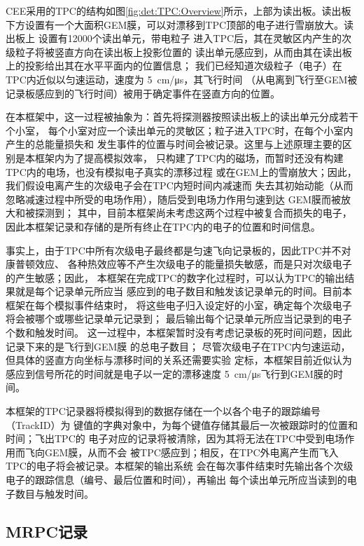 \documentclass[bachelor,openany,oneside,color]{buaathesis}
\begin{document}
CEE采用的TPC的结构如图\ref{fig:det:TPC:Overview}所示，上部为读出板。读出板
下方设置有一个大面积GEM膜，可以对漂移到TPC顶部的电子进行雪崩放大。读出板上
设置有12000个读出单元\cite{技术文档,Lyu:ConceptDesign}，带电粒子
进入TPC后，其在灵敏区内产生的次级粒子将被竖直方向在读出板上投影位置的
读出单元感应到，从而由其在读出板上的投影给出其在水平平面内的位置信息；
我们已经知道次级粒子（电子）在TPC内近似以匀速运动，速度为
\SI{5}{\centi\meter/\micro\second}，其飞行时间
（从电离到飞行至GEM被记录板感应到的飞行时间）被用于确定事件在竖直方向的位置。

在本框架中，这一过程被抽象为：首先将探测器按照读出板上的读出单元分成若干个小室，
每个小室对应一个读出单元的灵敏区；粒子进入TPC时，在每个小室内产生的总能量损失和
发生事件的位置与时间会被记录。这里与上述原理主要的区别是本框架内为了提高模拟效率，
只构建了TPC内的磁场，而暂时还没有构建TPC内的电场，也没有模拟电子真实的漂移过程
或在GEM上的雪崩放大；因此，我们假设电离产生的次级电子会在TPC内短时间内减速而
失去其初始动能（从而忽略减速过程中所受的电场作用），随后受到电场力作用匀速到达
GEM膜而被放大和被探测到；
其中，目前本框架尚未考虑这两个过程中被复合而损失的电子，
因此本框架记录和存储的是所有终止在TPC内的电子的位置和时间信息。

事实上，由于TPC中所有次级电子最终都是匀速飞向记录板的，因此TPC并不对康普顿效应、
各种热效应等不产生次级电子的能量损失敏感，而是只对次级电子的产生敏感；因此，
本框架在完成TPC的数字化过程时，可以认为TPC的输出结果就是每个记录单元所应当
感应到的电子数目和触发该记录单元的时间。目前本框架在每个模拟事件结束时，
将这些电子归入设定好的小室，确定每个次级电子将会被哪个或哪些记录单元记录到；
最后输出每个记录单元所应当记录到的电子个数和触发时间。
这一过程中，本框架暂时没有考虑记录板的死时间问题，因此记录下来的是飞行到GEM膜
的总电子数目；
尽管次级电子在TPC内匀速运动，但具体的竖直方向坐标与漂移时间的关系还需要实验
定标，本框架目前近似认为感应到信号所花的时间就是电子以一定的漂移速度
\SI{5}{\centi\meter/\micro\second}飞行到GEM膜的时间。

本框架的TPC记录器将模拟得到的数据存储在一个以各个电子的跟踪编号（TrackID）为
键值的字典对象中，为每个键值存储其最后一次被跟踪时的位置和时间；飞出TPC的
电子对应的记录将被清除，因为其将无法在TPC中受到电场作用而飞向GEM膜，从而不会
被TPC感应到；相反，在TPC外电离产生而飞入TPC的电子将会被记录。本框架的输出系统
会在每次事件结束时先输出各个次级电子的跟踪信息（编号、最后位置和时间），再输出
每个读出单元所应当读到的电子数目与触发时间。

\subsection{MRPC记录}\label{ssec:digi:MRPC}
\end{document}
